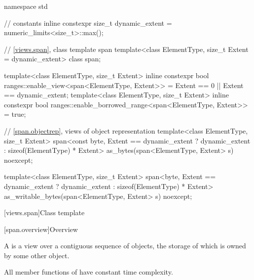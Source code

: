 %
\begin{codeblock}
namespace std {
  // constants
  inline constexpr size_t dynamic_extent = numeric_limits<size_t>::max();

  // \ref{views.span}, class template span
  template<class ElementType, size_t Extent = dynamic_extent>
    class span;

  template<class ElementType, size_t Extent>
    inline constexpr bool ranges::enable_view<span<ElementType, Extent>> =
      Extent == 0 || Extent == dynamic_extent;
  template<class ElementType, size_t Extent>
    inline constexpr bool ranges::enable_borrowed_range<span<ElementType, Extent>> = true;

  // \ref{span.objectrep}, views of object representation
  template<class ElementType, size_t Extent>
    span<const byte, Extent == dynamic_extent ? dynamic_extent : sizeof(ElementType) * Extent>
      as_bytes(span<ElementType, Extent> s) noexcept;

  template<class ElementType, size_t Extent>
    span<byte, Extent == dynamic_extent ? dynamic_extent : sizeof(ElementType) * Extent>
      as_writable_bytes(span<ElementType, Extent> s) noexcept;
}
\end{codeblock}

[views.span]{Class template }

[span.overview]{Overview}

\pnum
{}%
A  is a view over a contiguous sequence of objects,
the storage of which is owned by some other object.

\pnum
All member functions of  have constant time complexity.

